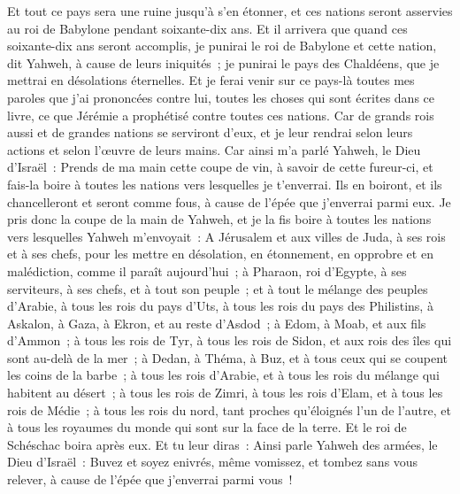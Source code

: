 \begin{multicols}{2}
Et tout ce pays sera une ruine jusqu'à s'en étonner, et ces nations seront asservies au roi de Babylone pendant soixante-dix ans.
Et il arrivera que quand ces soixante-dix ans seront accomplis, je punirai le roi de Babylone et cette nation, dit Yahweh, à cause de leurs iniquités~; je punirai le pays des Chaldéens, que je mettrai en désolations éternelles.
Et je ferai venir sur ce pays-là toutes mes paroles que j'ai prononcées contre lui, toutes les choses qui sont écrites dans ce livre, ce que Jérémie a prophétisé contre toutes ces nations.
Car de grands rois aussi et de grandes nations se serviront d'eux, et je leur rendrai selon leurs actions et selon l'œuvre de leurs mains.
Car ainsi m'a parlé Yahweh, le Dieu d'Israël~: Prends de ma main cette coupe de vin, à savoir de cette fureur-ci, et fais-la boire à toutes les nations vers lesquelles je t'enverrai.
Ils en boiront, et ils chancelleront et seront comme fous, à cause de l'épée que j'enverrai parmi eux.
Je pris donc la coupe de la main de Yahweh, et je la fis boire à toutes les nations vers lesquelles Yahweh m'envoyait~:
A Jérusalem et aux villes de Juda, à ses rois et à ses chefs, pour les mettre en désolation, en étonnement, en opprobre et en malédiction, comme il paraît aujourd'hui~;
à Pharaon, roi d'Egypte, à ses serviteurs, à ses chefs, et à tout son peuple~;
et à tout le mélange des peuples d'Arabie, à tous les rois du pays d'Uts, à tous les rois du pays des Philistins, à Askalon, à Gaza, à Ekron, et au reste d'Asdod~;
à Edom, à Moab, et aux fils d'Ammon~;
à tous les rois de Tyr, à tous les rois de Sidon, et aux rois des îles qui sont au-delà de la mer~;
à Dedan, à Théma, à Buz, et à tous ceux qui se coupent les coins de la barbe~;
à tous les rois d'Arabie, et à tous les rois du mélange qui habitent au désert~;
à tous les rois de Zimri, à tous les rois d'Elam, et à tous les rois de Médie~;
à tous les rois du nord, tant proches qu'éloignés l'un de l'autre, et à tous les royaumes du monde qui sont sur la face de la terre. Et le roi de Schéschac boira après eux.
Et tu leur diras~: Ainsi parle Yahweh des armées, le Dieu d'Israël~: Buvez et soyez enivrés, même vomissez, et tombez sans vous relever, à cause de l'épée que j'enverrai parmi vous~!

\end{multicols}
